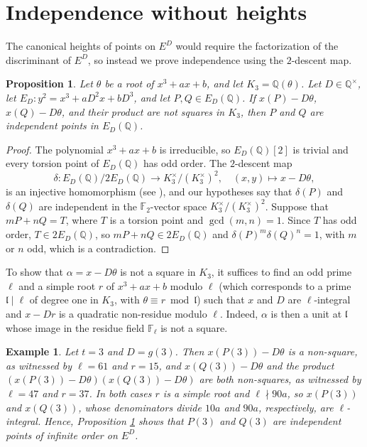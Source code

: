 \documentclass[11pt]{amsart}
\newtheorem{prop}[defn]{Proposition}
\newtheorem{example}[defn]{Example}
\newcommand{\Q}{\mathbb Q}
\newcommand{\F}{\mathbb F}
\begin{document}
\section{Independence without heights}\label{sec-independence}

The canonical heights of points on $E^D$ would require the factorization of the discriminant of $E^D$, so instead we prove independence using the $2$-descent map.

\begin{prop}\label{prop-independence}
Let $\theta$ be a root of $x^3+ax+b$, and let $K_3=\Q(\theta)$. Let $D\in\Q^\times$, let $E_D\colon y^2=x^3+aD^2x+bD^3$, and let $P,Q\in E_D(\Q)$. If $x(P)-D\theta$, $x(Q)-D\theta$, and their product are not squares in $K_3$, then $P$ and $Q$ are independent points in $E_D(\Q)$.
\end{prop}

\begin{proof}
The polynomial $x^3+ax+b$ is irreducible, so $E_D(\Q)[2]$ is trivial and every torsion point of $E_D(\Q)$ has odd order. The $2$-descent map
$$\delta\colon E_D(\Q)/2E_D(\Q)\to K_3^\times/(K_3^\times)^2,\quad (x,y)\mapsto x-D\theta,$$
is an injective homomorphism (see \cite[Ch.~X]{silverman1}), and our hypotheses say that $\delta(P)$ and $\delta(Q)$ are independent in the $\F_2$-vector space $K_3^\times/(K_3^\times)^2$. Suppose that $mP+nQ=T$, where $T$ is a torsion point and $\gcd(m,n)=1$. Since $T$ has odd order, $T\in 2E_D(\Q)$, so $mP+nQ\in 2E_D(\Q)$ and $\delta(P)^m\delta(Q)^n=1$, with $m$ or $n$ odd, which is a contradiction.
\end{proof}

To show that $\alpha=x-D\theta$ is not a square in $K_3$, it suffices to find an odd prime $\ell$ and a simple root $r$ of $x^3+ax+b$ modulo $\ell$ (which corresponds to a prime $\mathfrak{l}\mid\ell$ of degree one in $K_3$, with $\theta\equiv r\bmod\mathfrak{l}$) such that $x$ and $D$ are $\ell$-integral and $x-Dr$ is a quadratic non-residue modulo $\ell$. Indeed, $\alpha$ is then a unit at $\mathfrak{l}$ whose image in the residue field $\F_\ell$ is not a square.

\begin{example}\label{ex-t3-indep}
Let $t=3$ and $D=g(3)$. Then $x(P(3))-D\theta$ is a non-square, as witnessed by $\ell=61$ and $r=15$, and $x(Q(3))-D\theta$ and the product $(x(P(3))-D\theta)(x(Q(3))-D\theta)$ are both non-squares, as witnessed by $\ell=47$ and $r=37$. In both cases $r$ is a simple root and $\ell\nmid 90a$, so $x(P(3))$ and $x(Q(3))$, whose denominators divide $10a$ and $90a$, respectively, are $\ell$-integral. Hence, Proposition \ref{prop-independence} shows that $P(3)$ and $Q(3)$ are independent points of infinite order on $E^D$.
\end{example}
\end{document}
